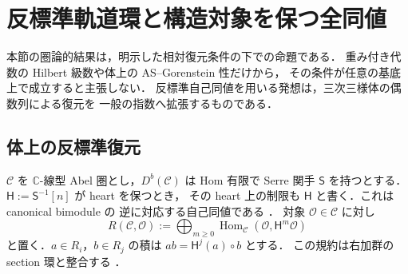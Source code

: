 \section{反標準軌道環と構造対象を保つ全同値}
\label{sec:ncdp-anticanonical-reconstruction}

本節の圏論的結果は，明示した相対復元条件の下での命題である．
重み付き代数の Hilbert 級数や体上の AS--Gorenstein 性だけから，
その条件が任意の基底上で成立すると主張しない．
反標準自己同値を用いる発想は，三次三様体の偶数列による復元を
一般の指数へ拡張するものである．

\subsection{体上の反標準復元}

$\mathcal C$ を $\mathbb C$-線型 Abel 圏とし，$D^b(\mathcal C)$ は
Hom 有限で Serre 関手 $\mathsf S$ を持つとする．
$\mathsf H:=\mathsf S^{-1}[n]$ が heart を保つとき，
その heart 上の制限も $\mathsf H$ と書く．これは canonical bimodule の
逆に対応する自己同値である
\cite[Definition 3.4 and Remark 3.5]{MoriUeyama2021}．
対象 $\mathcal O\in\mathcal C$ に対し
\[
 R(\mathcal C,\mathcal O)
 :=\bigoplus_{m\ge0}\operatorname{Hom}_{\mathcal C}
       (\mathcal O,\mathsf H^m\mathcal O)
\]
と置く．$a\in R_i$，$b\in R_j$ の積は
$ab=\mathsf H^j(a)\circ b$ とする．
この規約は右加群の section 環と整合する
\cite[Definition 2.1(5)]{MoriUeyama2021}．

